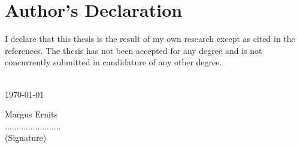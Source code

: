 \clearpage
\chapter*{Author’s Declaration}
\label{declaration}
\thispagestyle{empty}
I declare that this thesis is the result of my own research except as cited in the references. 
The thesis has not been accepted for any degree and is not concurrently submitted in candidature 
of any other degree.
\\
[2cm]\\

\begin{minipage}{0.5\textwidth}
	\begin{flushleft}
	\today \\
	\end{flushleft}
\end{minipage}
\begin{minipage}{0.5\textwidth}
	\begin{flushright}
	Margus Ernits \\
	........................ \\
	(Signature) 
	\end{flushright}
\end{minipage}
